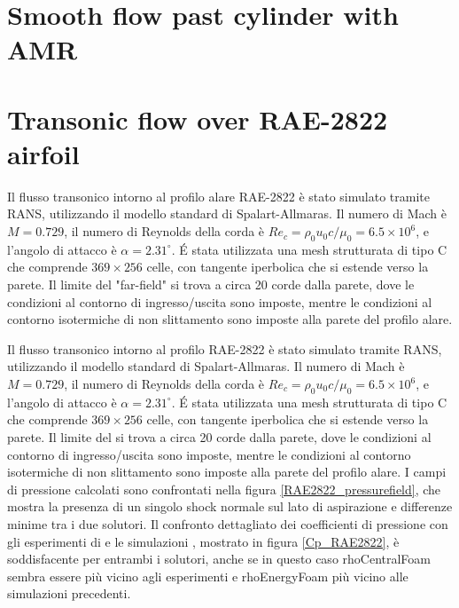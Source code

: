 \documentclass[a5paper]{sapthesis}
\begin{document}
	\section{Smooth flow past cylinder with AMR}
	
	\section{Transonic flow over RAE-2822 airfoil}
	Il flusso transonico intorno al profilo alare RAE-2822 è stato simulato tramite RANS, utilizzando il modello standard di Spalart-Allmaras. Il numero di Mach è $M = 0.729$, il numero di Reynolds della corda è $Re_c = \rho_0 u_0 c /\mu_0 = 6.5 \times 10^6$, e l'angolo di attacco è $\alpha = 2.31^\circ$. \'E stata utilizzata una mesh strutturata di tipo C che comprende $369 \times 256$ celle, con tangente iperbolica che si estende verso la parete. Il limite del "far-field" si trova a circa 20 corde dalla parete, dove le condizioni al contorno di ingresso/uscita sono imposte, mentre le condizioni al contorno isotermiche di non slittamento sono imposte alla parete del profilo alare.
	
		Il flusso transonico intorno al profilo RAE-2822 è stato simulato tramite RANS, utilizzando il modello standard di Spalart-Allmaras. Il numero di Mach è $M = 0.729$, il numero di Reynolds della corda è $Re_c = \rho_0 u_0 c /\mu_0 = 6.5 \times 10^6$, e l'angolo di attacco è $\alpha = 2.31^\circ$. \'E stata utilizzata una mesh strutturata di tipo C che comprende $369 \times 256$ celle, con tangente iperbolica che si estende verso la parete. Il limite del  si trova a circa 20 corde dalla parete, dove le condizioni al contorno di ingresso/uscita sono imposte, mentre le condizioni al contorno isotermiche di non slittamento sono imposte alla parete del profilo alare. I campi di pressione calcolati sono confrontati nella figura \ref{RAE2822_pressurefield}, che mostra la presenza di un singolo shock normale sul lato di aspirazione e differenze minime tra i due solutori. Il confronto dettagliato dei coeﬃcienti di pressione con gli esperimenti di \citet{cook1977aerofoil} e le simulazioni \cite{slater2010rae2822}, mostrato in figura \ref{Cp_RAE2822}, è soddisfacente per entrambi i solutori, anche se in questo caso rhoCentralFoam sembra essere più vicino agli esperimenti e rhoEnergyFoam più vicino alle simulazioni precedenti.
	
\end{document}
